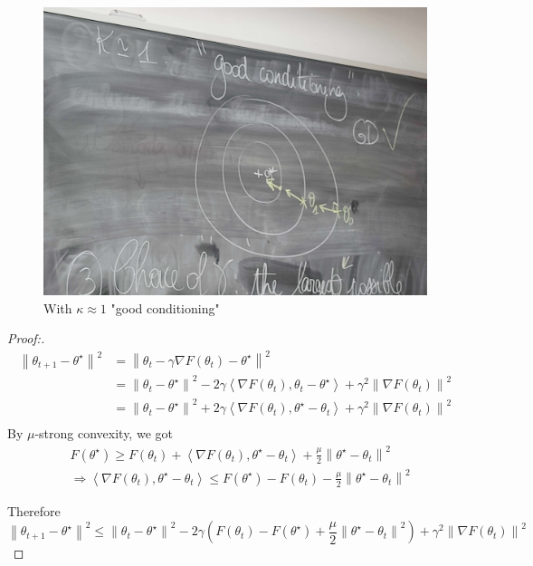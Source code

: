 \begin{note}
    \begin{figure}[!htbp]
        \centering
        \includegraphics[width=.5\textwidth]{figs/good_kappa.jpg}
        \caption{With $ \kappa \approx 1 $ "good conditioning" }
    \end{figure}

    \begin{proof}[Proof:]
        \begin{align*}
            \left\| \theta _{t+1} - \theta ^\star  \right\| ^2 
                &= \left\| \theta _t - \gamma \nabla F(\theta _t) - \theta ^\star  \right\| ^2 \\
                &= \left\| \theta _t - \theta ^\star  \right\| ^2 - 2 \gamma \left\langle \nabla F (\theta _t), \theta _t - \theta ^\star  \right\rangle + \gamma ^2 \left\| \nabla F(\theta _t) \right\| ^2 \\
                &= \left\| \theta _t - \theta ^\star  \right\| ^2 + 2 \gamma \left\langle \nabla F (\theta _t), \theta ^\star - \theta _t \right\rangle + \gamma ^2 \left\| \nabla F(\theta _t) \right\| ^2 \\
        \end{align*}
        By $ \mu  $-strong convexity, we got 
        \begin{align*}
            &F(\theta ^\star ) \geq F(\theta _t) + \left\langle \nabla F(\theta _t) , \theta ^\star - \theta _t  \right\rangle + \frac{\mu }{2}\left\| \theta ^\star - \theta _t \right\| ^2 \\
            & \Rightarrow \left\langle \nabla F(\theta _t) , \theta ^\star - \theta _t \right\rangle \leq F(\theta ^\star ) - F(\theta _t) - \frac{\mu }{2}\left\| \theta ^\star -  \theta _t \right\| ^2
        \end{align*}
        
        Therefore $\left\| \theta_{t+1} - \theta^{\star }  \right\|^2 \leq \left\| \theta_t - \theta^{\star }\right\|^2 - 2 \gamma (F(\theta_t) - F(\theta ^{\star }) + \dfrac{\mu}{2} \left\| \theta ^{\star } - \theta_t \right\|^2 ) + \gamma ^2 \left\| \nabla F(\theta_t ) \right\|^2    $


\end{proof}
\end{note}
